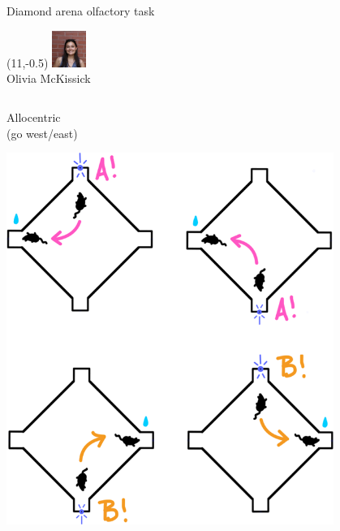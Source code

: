 \documentclass[bigger]{beamer}
\begin{document}
\begin{frame}[label={sec:org6329642}]{Diamond arena olfactory task}
\begin{textblock}{5}(11,-0.5)
\center
\includegraphics[width=3em]{img/olivia.jpg}\\
\scriptsize
Olivia McKissick
\end{textblock}
\begin{columns}
\begin{column}[t]{0.5\columnwidth}
\center
Allocentric\\
(go west/east)
\begin{center}
\includegraphics[width=0.8\textwidth]{img/allocentric-task.png}
\end{center}
\end{column}


\end{columns}
\end{frame}
\end{document}
